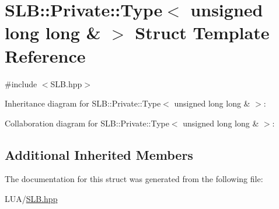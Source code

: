 \hypertarget{structSLB_1_1Private_1_1Type_3_01unsigned_01long_01long_01_6_01_4}{}\section{S\+LB\+:\+:Private\+:\+:Type$<$ unsigned long long \& $>$ Struct Template Reference}
\label{structSLB_1_1Private_1_1Type_3_01unsigned_01long_01long_01_6_01_4}


{\ttfamily \#include $<$S\+L\+B.\+hpp$>$}



Inheritance diagram for S\+LB\+:\+:Private\+:\+:Type$<$ unsigned long long \& $>$\+:


Collaboration diagram for S\+LB\+:\+:Private\+:\+:Type$<$ unsigned long long \& $>$\+:
\subsection*{Additional Inherited Members}


The documentation for this struct was generated from the following file\+:\begin{DoxyCompactItemize}
\item 
L\+U\+A/\hyperlink{SLB_8hpp}{S\+L\+B.\+hpp}\end{DoxyCompactItemize}
